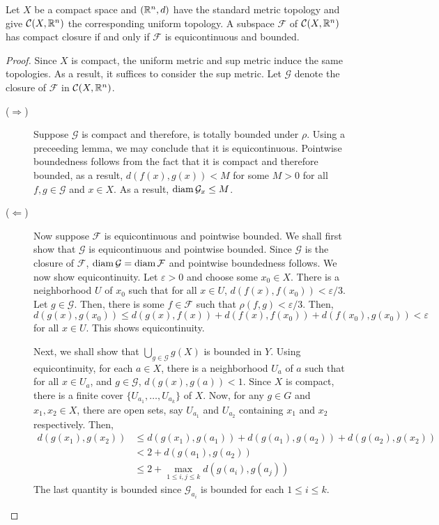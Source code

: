 \begin{theorem}
    Let $X$ be a compact space and $(\mathbb{R}^n,d)$ have the standard metric topology and give $\mathcal C(X,\mathbb{R}^n)$ the corresponding uniform topology. A subspace $\mathcal F$ of $\mathcal C(X,\mathbb{R}^n)$ has compact closure if and only if $\mathcal F$ is equicontinuous and bounded.
\end{theorem}
\begin{proof}
Since $X$ is compact, the uniform metric and sup metric induce the same topologies. As a result, it suffices to consider the sup metric. Let $\mathcal G$ denote the closure of $\mathcal F$ in $\mathcal C(X,\mathbb{R}^n)$.
\begin{description}
\item[($\Longrightarrow$)] Suppose $\mathcal G$ is compact and therefore, is totally bounded under $\rho$. Using a preceeding lemma, we may conclude that it is equicontinuous. Pointwise boundedness follows from the fact that it is compact and therefore bounded, as a result, $d(f(x), g(x)) < M$ for some $M > 0$ for all $f,g\in\mathcal G$ and $x\in X$. As a result, $\operatorname{diam}\mathcal G_x\le M$. 

\item[($\Longleftarrow$)] Now suppose $\mathcal F$ is equicontinuous and pointwise bounded. We shall first show that $\mathcal G$ is equicontinuous and pointwise bounded. Since $\mathcal G$ is the closure of $\mathcal F$, $\operatorname{diam}\mathcal G = \operatorname{diam}\mathcal F$ and pointwise boundedness follows. We now show equicontinuity. Let $\varepsilon > 0$ and choose some $x_0\in X$. There is a neighborhood $U$ of $x_0$ such that for all $x\in U$, $d(f(x), f(x_0)) < \varepsilon/3$. Let $g\in\mathcal G$. Then, there is some $f\in\mathcal F$ such that $\rho(f,g) < \varepsilon/3$. Then, 
\begin{equation*}
    d(g(x), g(x_0))\le d(g(x), f(x)) + d(f(x), f(x_0)) + d(f(x_0), g(x_0)) < \varepsilon
\end{equation*}
for all $x\in U$. This shows equicontinuity.

Next, we shall show that $\bigcup\limits_{g\in\mathcal G} g(X)$ is bounded in $Y$. Using equicontinuity, for each $a\in X$, there is a neighborhood $U_a$ of $a$ such that for all $x\in U_a$, and $g\in\mathcal G$, $d(g(x), g(a)) < 1$. Since $X$ is compact, there is a finite cover $\{U_{a_1},\ldots,U_{a_k}\}$ of $X$. Now, for any $g\in G$ and $x_1,x_2\in X$, there are open sets, say $U_{a_1}$ and $U_{a_2}$ containing $x_1$ and $x_2$ respectively. Then, 
\begin{align*}
    d(g(x_1), g(x_2)) &\le d(g(x_1),g(a_1)) + d(g(a_1), g(a_2)) + d(g(a_2),g(x_2)) \\
    &< 2 + d(g(a_1), g(a_2))\\
    &\le 2 + \max_{1\le i,j\le k} d(g(a_i), g(a_j))
\end{align*}
The last quantity is bounded since $\mathcal G_{a_i}$ is bounded for each $1\le i\le k$.


\end{description}
\end{proof}
